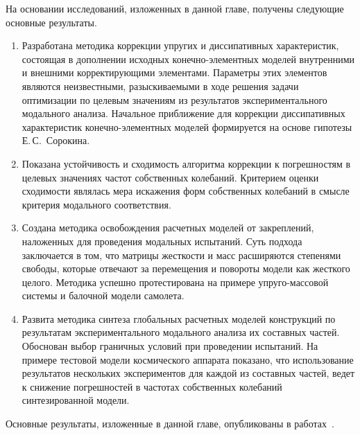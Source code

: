 На основании исследований, изложенных в данной главе, получены следующие основные результаты.
\begin{enumerate}
	\item Разработана методика коррекции упругих и диссипативных характеристик, состоящая в дополнении исходных конечно-элементных моделей внутренними и внешними корректирующими элементами. Параметры этих элементов являются неизвестными, разыскиваемыми в ходе решения задачи оптимизации по целевым значениям из результатов экспериментального модального анализа. Начальное приближение для коррекции диссипативных характеристик конечно-элементных моделей формируется на основе гипотезы Е.\,С.~Сорокина.
	\item Показана устойчивость и сходимость алгоритма коррекции к погрешностям в целевых значениях частот собственных колебаний. Критерием оценки сходимости являлась мера искажения форм собственных колебаний в смысле критерия модального соответствия.
	\item Создана методика освобождения расчетных моделей от закреплений, наложенных для проведения модальных испытаний. Суть подхода заключается в том, что матрицы жесткости и масс расширяются степенями свободы, которые отвечают за перемещения и повороты модели как жесткого
целого. Методика успешно протестирована на примере упруго-массовой системы и балочной модели самолета.
	\item Развита методика синтеза глобальных расчетных моделей конструкций по результатам экспериментального модального анализа их составных частей. Обоснован выбор граничных условий при проведении испытаний. На примере тестовой модели космического аппарата показано, что использование результатов нескольких экспериментов для каждой из составных частей, ведет к снижение погрешностей в частотах собственных колебаний синтезированной модели.
\end{enumerate}

Основные результаты, изложенные в данной главе, опубликованы в работах~\cite{lib:author:iss2018:synthesis, lib:author:spacecraft:cms, lib:author:nstuEn:synthesis, lib:author:samsc:freeing, lib:author:nstuEn:updating, lib:author:iss2019:synthesis, lib:author:nti2019:updating, lib:author:nsu:synthesis, lib:author:nti2020:updating, lib:author:patent:freeing, lib:author:pnrpu:updating}.